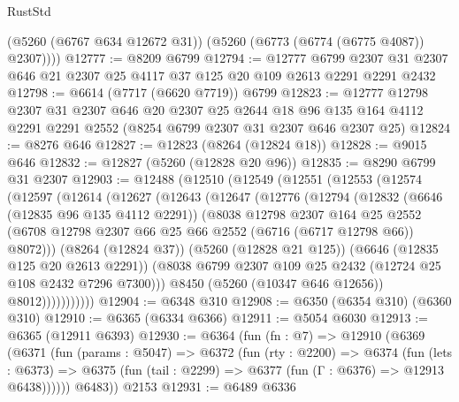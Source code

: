 \begin{lexlean}{RustStd}
\begin{coremodule}
        (@5260 (@6767 @634 @12672 @31))
        (@5260 (@6773 (@6774 (@6775 @4087)) @2307))))
@12777 := @8209 @6799
@12794 := @12777
    @6799
    @2307
    @31
    @2307
    @646
    @21
    @2307
    @25
    @4117
    @37
    @125
    @20
    @109
    @2613
    @2291
    @2291
    @2432
@12798 := @6614 (@7717 (@6620 @7719)) @6799
@12823 := @12777
    @12798
    @2307
    @31
    @2307
    @646
    @20
    @2307
    @25
    @2644
    @18
    @96
    @135
    @164
    @4112
    @2291
    @2291
    @2552
    (@8254 @6799 @2307 @31 @2307 @646 @2307 @25)
@12824 := @8276 @646
@12827 := @12823 (@8264 (@12824 @18))
@12828 := @9015 @646
@12832 := @12827 (@5260 (@12828 @20 @96))
@12835 := @8290 @6799 @31 @2307
@12903 := @12488
    (@12510
      (@12549
        (@12551
          (@12553
            (@12574
              (@12597
                (@12614
                  (@12627
                    (@12643
                      (@12647
                        (@12776
                          (@12794
                            (@12832
                              (@6646 (@12835 @96 @135 @4112 @2291))
                              (@8038
                                @12798
                                @2307
                                @164
                                @25
                                @2552
                                (@6708
                                  @12798
                                  @2307
                                  @66
                                  @25
                                  @66
                                  @2552
                                  (@6716 (@6717 @12798 @66))
                                  @8072)))
                            (@8264 (@12824 @37))
                            (@5260 (@12828 @21 @125))
                            (@6646 (@12835 @125 @20 @2613 @2291))
                            (@8038 @6799 @2307 @109 @25 @2432 (@12724 @25 @108 @2432 @7296 @7300)))
                          @8450
                          (@5260 (@10347 @646 @12656))
                          @8012)))))))))))
@12904 := @6348 @310
@12908 := @6350 (@6354 @310) (@6360 @310)
@12910 := @6365 (@6334 @6366)
@12911 := @5054 @6030
@12913 := @6365 (@12911 @6393)
@12930 := @6364
    (fun (fn : @7) =>
    @12910
      (@6369
        (@6371
          (fun (params : @5047) =>
          @6372
            (fun (rty : @2200) =>
            @6374
              (fun (lets : @6373) =>
              @6375 (fun (tail : @2299) => @6377 (fun (Γ : @6376) => @12913 @6438))))))
        @6483))
    @2153
@12931 := @6489 @6336

\end{coremodule}
\end{lexlean}
